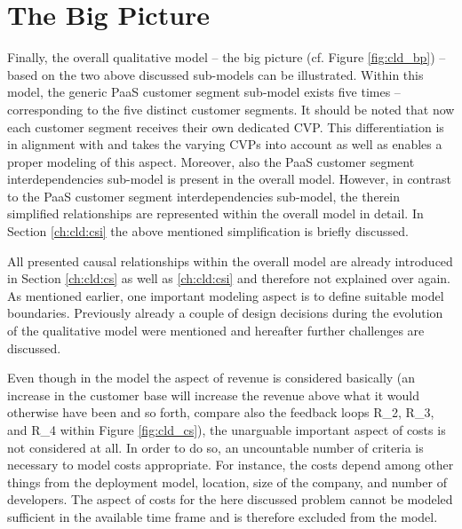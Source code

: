 \section{The Big Picture}\label{ch:cld:bp}

Finally, the overall qualitative model -- the big picture (cf. Figure \ref{fig:cld_bp}) -- based on the two above discussed sub-models can be illustrated. Within this model, the generic \ac{PaaS} customer segment sub-model exists five times -- corresponding to the five distinct customer segments. It should be noted that now each customer segment receives their own dedicated \ac{CVP}. This differentiation is in alignment with \citet{Johnson2008} and takes the varying \acp{CVP} into account as well as enables a proper modeling of this aspect. Moreover, also the \ac{PaaS} customer segment interdependencies sub-model is present in the overall model. However, in contrast to the \ac{PaaS} customer segment interdependencies sub-model, the therein simplified relationships are represented within the overall model in detail. In Section \ref{ch:cld:csi} the above mentioned simplification is briefly discussed.

All presented causal relationships within the overall model are already introduced in Section \ref{ch:cld:cs} as well as \ref{ch:cld:csi} and therefore not explained over again. As mentioned earlier, one important modeling aspect is to define suitable model boundaries. Previously already a couple of design decisions during the evolution of the qualitative model were mentioned and hereafter further challenges are discussed.

Even though in the model the aspect of revenue is considered basically (an increase in the customer base will increase the revenue above what it would otherwise have been and so forth, compare also the feedback loops R\_2, R\_3, and R\_4 within Figure \ref{fig:cld_cs}), the unarguable important aspect of costs is not considered at all. In order to do so, an uncountable number of criteria is necessary to model costs appropriate. For instance, the costs depend among other things from the deployment model, location, size of the company, and number of developers. The aspect of costs for the here discussed problem cannot be modeled sufficient in the available time frame and is therefore excluded from the model.

